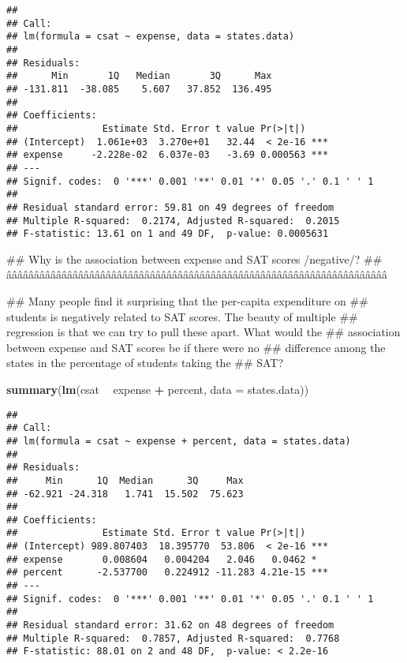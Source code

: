 \documentclass[]{article}
\newenvironment{Shaded}{\begin{snugshade}}{\end{snugshade}}
\newcommand{\KeywordTok}[1]{\textcolor[rgb]{0.13,0.29,0.53}{\textbf{#1}}}
\newcommand{\DataTypeTok}[1]{\textcolor[rgb]{0.13,0.29,0.53}{#1}}
\newcommand{\StringTok}[1]{\textcolor[rgb]{0.31,0.60,0.02}{#1}}
\newcommand{\OperatorTok}[1]{\textcolor[rgb]{0.81,0.36,0.00}{\textbf{#1}}}
\newcommand{\NormalTok}[1]{#1}
\begin{document}
\begin{verbatim}
## 
## Call:
## lm(formula = csat ~ expense, data = states.data)
## 
## Residuals:
##      Min       1Q   Median       3Q      Max 
## -131.811  -38.085    5.607   37.852  136.495 
## 
## Coefficients:
##               Estimate Std. Error t value Pr(>|t|)    
## (Intercept)  1.061e+03  3.270e+01   32.44  < 2e-16 ***
## expense     -2.228e-02  6.037e-03   -3.69 0.000563 ***
## ---
## Signif. codes:  0 '***' 0.001 '**' 0.01 '*' 0.05 '.' 0.1 ' ' 1
## 
## Residual standard error: 59.81 on 49 degrees of freedom
## Multiple R-squared:  0.2174, Adjusted R-squared:  0.2015 
## F-statistic: 13.61 on 1 and 49 DF,  p-value: 0.0005631
\end{verbatim}

\begin{Shaded}
\begin{Highlighting}[]
\NormalTok{## Why is the association between expense and SAT scores /negative/?}
\NormalTok{## âââââââââââââââââââââââââââââââââââââââââââââââââââââââââââââââââââââ}

\NormalTok{##   Many people find it surprising that the per-capita expenditure on}
\NormalTok{##   students is negatively related to SAT scores. The beauty of multiple}
\NormalTok{##   regression is that we can try to pull these apart. What would the}
\NormalTok{##   association between expense and SAT scores be if there were no}
\NormalTok{##   difference among the states in the percentage of students taking the}
\NormalTok{##   SAT?}

\KeywordTok{summary}\NormalTok{(}\KeywordTok{lm}\NormalTok{(csat }\OperatorTok{~}\StringTok{ }\NormalTok{expense }\OperatorTok{+}\StringTok{ }\NormalTok{percent, }\DataTypeTok{data =}\NormalTok{ states.data))}
\end{Highlighting}
\end{Shaded}

\begin{verbatim}
## 
## Call:
## lm(formula = csat ~ expense + percent, data = states.data)
## 
## Residuals:
##     Min      1Q  Median      3Q     Max 
## -62.921 -24.318   1.741  15.502  75.623 
## 
## Coefficients:
##               Estimate Std. Error t value Pr(>|t|)    
## (Intercept) 989.807403  18.395770  53.806  < 2e-16 ***
## expense       0.008604   0.004204   2.046   0.0462 *  
## percent      -2.537700   0.224912 -11.283 4.21e-15 ***
## ---
## Signif. codes:  0 '***' 0.001 '**' 0.01 '*' 0.05 '.' 0.1 ' ' 1
## 
## Residual standard error: 31.62 on 48 degrees of freedom
## Multiple R-squared:  0.7857, Adjusted R-squared:  0.7768 
## F-statistic: 88.01 on 2 and 48 DF,  p-value: < 2.2e-16
\end{verbatim}
\end{document}
